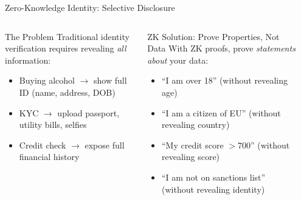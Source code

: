 \documentclass[8pt,aspectratio=169]{beamer}
\begin{document}
\begin{frame}{Zero-Knowledge Identity: Selective Disclosure}
\begin{columns}[T]
\begin{block}{\footnotesize The Problem}
\footnotesize
Traditional identity verification requires revealing \emph{all} information:
\begin{itemize}
\item Buying alcohol $\to$ show full ID (name, address, DOB)
\item KYC $\to$ upload passport, utility bills, selfies
\item Credit check $\to$ expose full financial history
\end{itemize}
\end{block}
\vspace{0.1cm}
\begin{exampleblock}{\footnotesize ZK Solution: Prove Properties, Not Data}
\footnotesize
With ZK proofs, prove \emph{statements about} your data:
\begin{itemize}
\item ``I am over 18'' (without revealing age)
\item ``I am a citizen of EU'' (without revealing country)
\item ``My credit score $> 700$'' (without revealing score)
\item ``I am not on sanctions list'' (without revealing identity)
\end{itemize}
\end{exampleblock}
\begin{center}
\end{center}
\end{columns}
\end{frame}
\end{document}
